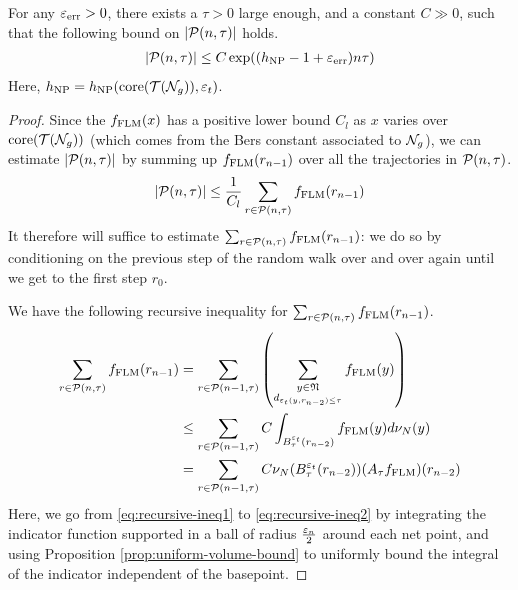\begin{proposition}
  \label{prop:rw-recurrence}
  For any $\varepsilon_{\mathrm{err}} > 0$, there exists a $\tau > 0$ large enough, and a constant $C \gg 0$,  such that the following bound on $\left| \mathcal{P}(n, \tau) \right|$ holds.
  \begin{align*}
    \left| \mathcal{P}(n, \tau) \right| \leq C \exp((h_{\mathrm{NP}} - 1 + \varepsilon_{\mathrm{err}})n\tau)
  \end{align*}
  Here, $h_{\mathrm{NP}} = h_{\mathrm{NP}}(\mathrm{core}(\mathcal{T}(\mathcal{N}_g)), \varepsilon_t)$.
\end{proposition}

\begin{proof}
  Since the $f_{\mathrm{FLM}}(x)$ has a positive lower bound $C_l$ as $x$ varies over $\mathrm{core}(\mathcal{T}(\mathcal{N}_g))$ (which comes from the Bers constant associated to $\mathcal{N}_g$), we can estimate $\left| \mathcal{P}(n, \tau) \right|$ by summing up $f_{\mathrm{FLM}}(r_{n-1})$ over all the trajectories in $\mathcal{P}(n, \tau)$.
  \begin{align*}
   \left| \mathcal{P}(n, \tau) \right| \leq \frac{1}{C_l} \sum_{r \in \mathcal{P}(n, \tau)} f_{\mathrm{FLM}}(r_{n-1})
  \end{align*}
  It therefore will suffice to estimate $\sum_{r \in \mathcal{P}(n, \tau)} f_{\mathrm{FLM}}(r_{n-1})$: we do so by conditioning on the previous step of the random walk over and over again until we get to the first step $r_0$.

  We have the following recursive inequality for $\sum_{r \in \mathcal{P}(n, \tau)} f_{\mathrm{FLM}}(r_{n-1})$.
  \begin{align}
    \sum_{r \in \mathcal{P}(n, \tau)} f_{\mathrm{FLM}}(r_{n-1}) &= \sum_{r \in \mathcal{P}(n-1, \tau)} \left( \sum_{\substack{y \in \mathfrak{N} \\  d_{\varepsilon_t(y, r_{n-2}) \leq \tau} } } f_{\mathrm{FLM}}(y) \right) \label{eq:recursive-ineq1} \\
                                              &\leq \sum_{r \in \mathcal{P}(n-1, \tau)} C \int_{B_{\tau}^{\varepsilon_t}(r_{n-2})} f_{\mathrm{FLM}}(y) d\nu_N(y) \label{eq:recursive-ineq2} \\
    &= \sum_{r \in \mathcal{P}(n-1, \tau)} C \nu_N(B_{\tau}^{\varepsilon_t}(r_{n-2})) (A_{\tau}f_{\mathrm{FLM}})(r_{n-2})
  \end{align}
  Here, we go from \eqref{eq:recursive-ineq1} to \eqref{eq:recursive-ineq2} by integrating the indicator function supported in a ball of radius $\frac{\varepsilon_n}{2}$ around each net point, and using Proposition \ref{prop:uniform-volume-bound} to uniformly bound the integral of the indicator independent of the basepoint.


\end{proof}
